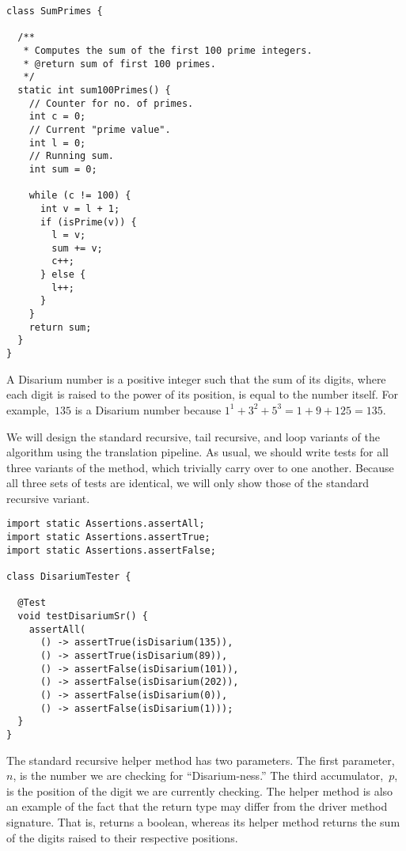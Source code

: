 \begin{lstlisting}[language=MyJava]
class SumPrimes {

  /**
   * Computes the sum of the first 100 prime integers.
   * @return sum of first 100 primes.
   */
  static int sum100Primes() {
    // Counter for no. of primes.
    int c = 0;   
    // Current "prime value".
    int l = 0;   
    // Running sum.
    int sum = 0; 
    
    while (c != 100) {
      int v = l + 1;
      if (isPrime(v)) {
        l = v;
        sum += v;
        c++;
      } else {
        l++;
      }
    }
    return sum;
  }
}
\end{lstlisting}

A Disarium number is a positive integer such that the sum of its digits, where each digit is raised to the power of its position, is equal to the number itself.
For example,~$135$ is a Disarium number because $1^1+3^2+5^3 = 1+9+125=135$. 

We will design the standard recursive, tail recursive, and loop variants of the algorithm using the translation pipeline.
As usual, we should write tests for all three variants of the method, which trivially carry over to one another.
Because all three sets of tests are identical, we will only show those of the standard recursive variant.

\begin{lstlisting}[language=MyJava]
import static Assertions.assertAll;
import static Assertions.assertTrue;
import static Assertions.assertFalse;

class DisariumTester {

  @Test
  void testDisariumSr() {
    assertAll(
      () -> assertTrue(isDisarium(135)),
      () -> assertTrue(isDisarium(89)),
      () -> assertFalse(isDisarium(101)),
      () -> assertFalse(isDisarium(202)),
      () -> assertFalse(isDisarium(0)),
      () -> assertFalse(isDisarium(1)));
  }
}
\end{lstlisting}

The standard recursive helper method has two parameters.
The first parameter,~$n$, is the number we are checking for ``Disarium-ness.''
The third accumulator,~$p$, is the position of the digit we are currently checking.
The helper method is also an example of the fact that the return type may differ from the driver method signature.
That is,  returns a boolean, whereas its helper method returns the sum of the digits raised to their respective positions.

